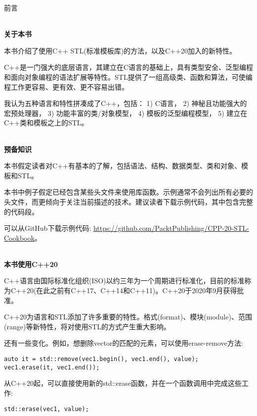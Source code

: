 \begin{flushright}
	 前言
\end{flushright}

\hspace*{\fill} \\ %
\noindent
\textbf{关于本书}

本书介绍了使用C++ STL(标准模板库)的方法，以及C++20加入的新特性。

C++是一门强大的底层语言，其建立在C语言的基础上，具有类型安全、泛型编程和面向对象编程的语法扩展等特性。STL提供了一组高级类、函数和算法，可使编程工作更容易、更有效、更不容易出错。

我认为五种语言和特性拼凑成了C++，包括：
1) C语言，
2) 神秘且功能强大的宏预处理器，
3) 功能丰富的类/对象模型，
4) 模板的泛型编程模型，
5) 建立在C++类和模板之上的STL。

\hspace*{\fill} \\ %
\noindent
\textbf{预备知识}

本书假定读者对C++有基本的了解，包括语法、结构、数据类型、类和对象、模板和STL。

本书中例子假定已经包含某些头文件来使用库函数。示例通常不会列出所有必要的头文件，而更倾向于关注当前描述的技术。建议读者下载示例代码，其中包含完整的代码段。

可以从GitHub下载示例代码: \url{https://github.com/PacktPublishing/CPP-20-STL-Cookbook}。

\hspace*{\fill} \\ %
\noindent
\textbf{本书使用C++20}

C++语言由国际标准化组织(ISO)以约三年为一个周期进行标准化，目前的标准称为C++20(在此之前有C++17、C++14和C++11)。C++20于2020年9月获得批准。

C++20为语言和STL添加了许多重要的特性。格式(format)、模块(module)、范围(range)等新特性，将对使用STL的方式产生重大影响。

还有一些变化。例如，想删除vector的匹配的元素，可以使用erase-remove方法:

\begin{lstlisting}[style=styleCXX]
auto it = std::remove(vec1.begin(), vec1.end(), value);
vec1.erase(it, vec1.end());
\end{lstlisting}

从C++20起，可以直接使用新的std::erase函数，并在一个函数调用中完成这些工作:

\begin{lstlisting}[style=styleCXX]
std::erase(vec1, value);
\end{lstlisting}

